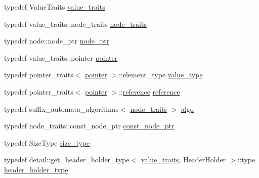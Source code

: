 \begin{DoxyCompactItemize}
\item 
typedef Value\+Traits \hyperlink{classboost_1_1intrusive_1_1suffix__automata__impl_abbf3dee8caf18613db903931801c6076}{value\+\_\+traits}
\item 
typedef value\+\_\+traits\+::node\+\_\+traits \hyperlink{classboost_1_1intrusive_1_1suffix__automata__impl_a3bf4d50a1aa7e13e6d6ded62d04a0296}{node\+\_\+traits}
\item 
typedef node\+::node\+\_\+ptr \hyperlink{classboost_1_1intrusive_1_1suffix__automata__impl_ab2d4128c7fc9c5ba87fa9eb5d50c318a}{node\+\_\+ptr}
\item 
typedef value\+\_\+traits\+::pointer \hyperlink{classboost_1_1intrusive_1_1suffix__automata__impl_aa30039fa797b95a84660985ab506f6ef}{pointer}
\item 
typedef pointer\+\_\+traits$<$ \hyperlink{classboost_1_1intrusive_1_1suffix__automata__impl_aa30039fa797b95a84660985ab506f6ef}{pointer} $>$\+::element\+\_\+type \hyperlink{classboost_1_1intrusive_1_1suffix__automata__impl_afc35e3e13adbae16ac9bfb049d719cd2}{value\+\_\+type}
\item 
typedef pointer\+\_\+traits$<$ \hyperlink{classboost_1_1intrusive_1_1suffix__automata__impl_aa30039fa797b95a84660985ab506f6ef}{pointer} $>$\+::\hyperlink{classboost_1_1intrusive_1_1suffix__automata__impl_a65352a440751b963521c55774953f0e4}{reference} \hyperlink{classboost_1_1intrusive_1_1suffix__automata__impl_a65352a440751b963521c55774953f0e4}{reference}
\item 
typedef suffix\+\_\+automata\+\_\+algorithms$<$ \hyperlink{classboost_1_1intrusive_1_1suffix__automata__impl_a3bf4d50a1aa7e13e6d6ded62d04a0296}{node\+\_\+traits} $>$ \hyperlink{classboost_1_1intrusive_1_1suffix__automata__impl_afa6f98d48851586ded5a3141789336d7}{algo}
\item 
typedef node\+\_\+traits\+::const\+\_\+node\+\_\+ptr \hyperlink{classboost_1_1intrusive_1_1suffix__automata__impl_acf5340d09b102d7fa183bcb304e96d0b}{const\+\_\+node\+\_\+ptr}
\item 
typedef Size\+Type \hyperlink{classboost_1_1intrusive_1_1suffix__automata__impl_ad2fe9bd542f914c94c7d0e42cce5613c}{size\+\_\+type}
\item 
typedef detail\+::get\+\_\+header\+\_\+holder\+\_\+type$<$ \hyperlink{classboost_1_1intrusive_1_1suffix__automata__impl_abbf3dee8caf18613db903931801c6076}{value\+\_\+traits}, Header\+Holder $>$\+::type \hyperlink{classboost_1_1intrusive_1_1suffix__automata__impl_a0b9a7a78415c25b6b3f377e1269f539a}{header\+\_\+holder\+\_\+type}
\end{DoxyCompactItemize}
